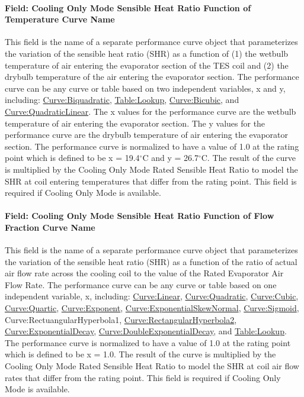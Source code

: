 \paragraph{Field: Cooling Only Mode Sensible Heat Ratio Function of Temperature Curve Name}\label{field-cooling-only-mode-sensible-heat-ratio-function-of-temperature-curve-name}

This field is the name of a separate performance curve object that parameterizes the variation of the sensible heat ratio (SHR) as a function of (1) the wetbulb temperature of air entering the evaporator section of the TES coil and (2) the drybulb temperature of the air entering the evaporator section. The performance curve can be any curve or table based on two independent variables, x and y, including: \hyperref[curvebiquadratic]{Curve:Biquadratic}, \hyperref[tablelookup]{Table:Lookup}, \hyperref[curvebicubic]{Curve:Bicubic}, and \hyperref[curvequadraticlinear]{Curve:QuadraticLinear}. The x values for the performance curve are the wetbulb temperature of air entering the evaporator section. The y values for the performance curve are the drybulb temperature of air entering the evaporator section. The performance curve is normalized to have a value of 1.0 at the rating point which is defined to be x = 19.4$^\circ$C and y = 26.7$^\circ$C. The result of the curve is multiplied by the Cooling Only Mode Rated Sensible Heat Ratio to model the SHR at coil entering temperatures that differ from the rating point. This field is required if Cooling Only Mode is available.

\paragraph{Field: Cooling Only Mode Sensible Heat Ratio Function of Flow Fraction Curve Name}\label{field-cooling-only-mode-sensible-heat-ratio-function-of-flow-fraction-curve-name}

This field is the name of a separate performance curve object that parameterizes the variation of the sensible heat ratio (SHR) as a function of the ratio of actual air flow rate across the cooling coil to the value of the Rated Evaporator Air Flow Rate. The performance curve can be any curve or table based on one independent variable, x, including: \hyperref[curvelinear]{Curve:Linear}, \hyperref[curvequadratic]{Curve:Quadratic}, \hyperref[curvecubic]{Curve:Cubic}, \hyperref[curvequartic]{Curve:Quartic}, \hyperref[curveexponent]{Curve:Exponent}, \hyperref[curveexponentialskewnormal]{Curve:ExponentialSkewNormal}, \hyperref[curvesigmoid]{Curve:Sigmoid}, Curve:RectuangularHyperbola1, \hyperref[curverectangularhyperbola2]{Curve:RectangularHyperbola2}, \hyperref[curveexponentialdecay]{Curve:ExponentialDecay}, \hyperref[curvedoubleexponentialdecay]{Curve:DoubleExponentialDecay}, and \hyperref[tablelookup]{Table:Lookup}. The performance curve is normalized to have a value of 1.0 at the rating point which is defined to be x = 1.0. The result of the curve is multiplied by the Cooling Only Mode Rated Sensible Heat Ratio to model the SHR at coil air flow rates that differ from the rating point. This field is required if Cooling Only Mode is available.

